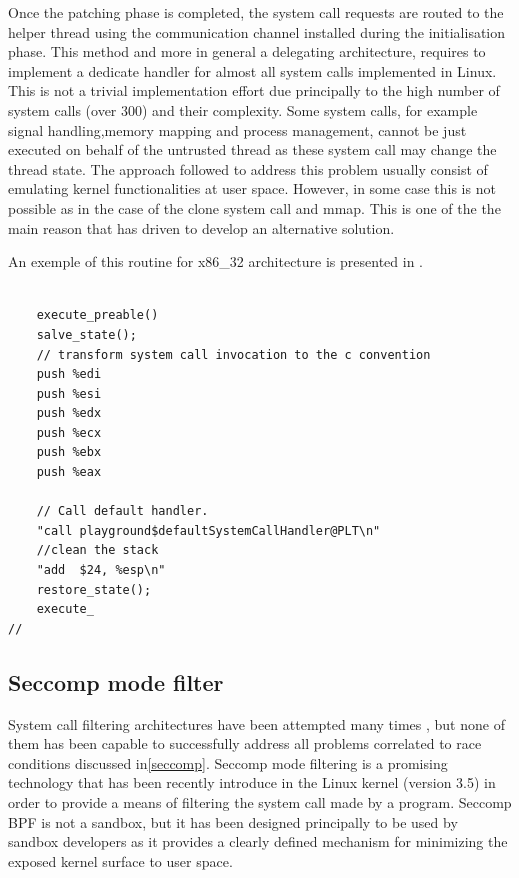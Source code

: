 Once the patching phase is completed, the system call requests are routed to the helper thread using the communication channel installed during the initialisation phase. This method and more in general a delegating architecture, requires to implement a dedicate handler for almost all system calls implemented in Linux. This is not a trivial implementation effort due principally to the high number of system calls (over 300) and their complexity. Some system calls, for example signal handling,memory mapping and process management, cannot be just executed on behalf of the untrusted thread as these system call may change the thread state.
The approach followed to address this problem usually consist of emulating kernel functionalities  at user space. However, in some case this is not possible as in the case of the clone system call and mmap. This is  one of the the main reason that has driven to develop an alternative solution.   

An exemple of this routine for x86\_32 architecture is presented in . 

\begin{lstlisting} 
	
	execute_preable()
	salve_state(); 
	// transform system call invocation to the c convention	
 	push %edi
    push %esi
    push %edx
    push %ecx
    push %ebx
    push %eax
    
    // Call default handler.
 	"call playground$defaultSystemCallHandler@PLT\n"
 	//clean the stack
 	"add  $24, %esp\n"
    restore_state(); 
    execute_
//

\end{lstlisting}


\subsection{Seccomp mode filter}
\label{filter}
           

System call filtering architectures have been attempted many times \cite{Provos02improvinghost,Janus,MapBox, Noordende_asecure, Jain99user-levelinfrastructure}, but none of them has been capable to successfully address all problems correlated to race conditions discussed in\ref{seccomp}. Seccomp mode filtering is a promising technology that has been recently introduce in the Linux kernel (version 3.5) in order to provide a means of filtering the system call made by a program. Seccomp BPF is not a sandbox, but it  has been designed principally to be used by sandbox developers as it provides a clearly defined mechanism for minimizing the exposed kernel surface to user space. 

